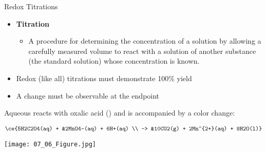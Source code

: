 \documentclass[handout]{beamer}
\begin{document}
\begin{frame}[allowframebreaks]{Redox Titrations}
	\begin{itemize}
		\item \textbf{Titration}
			\begin{itemize}
				\item A procedure for determining the
					concentration of a solution by allowing
					a carefully measured volume to react
					with a solution of another substance
					(the standard solution) whose
					concentration is known.
			\end{itemize}

			\bigskip
		\item Redox (like all) titrations must demonstrate 100\% yield
		\item A change must be observable at the endpoint
	\end{itemize}
		
	\framebreak
	Aqueous  reacts with oxalic acid () and is
	accompanied by a color change:

		{
		\footnotesize
		\begin{align*}
			\ce{5H2C2O4(aq) + &2MnO4-(aq) + 6H+(aq) \\
			-> &10CO2(g) + 2Mn^{2+}(aq) + 8H2O(l)}
		\end{align*}}

		\begin{center}
			\texttt{[image: 07\_06\_Figure.jpg]}
		\end{center}
\end{frame}
\end{document}
